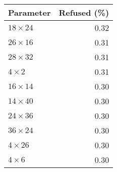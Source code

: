 \begin{tabular}{lr}
  \toprule
  Parameter & Refused (\%) \\
  \midrule
  $18 \times 24$ & 0.32 \\
  $26 \times 16$ & 0.31 \\
  $28 \times 32$ & 0.31 \\
  $4 \times 2$ & 0.31 \\
  $16 \times 14$ & 0.30 \\
  $14 \times 40$ & 0.30 \\
  $24 \times 36$ & 0.30 \\
  $36 \times 24$ & 0.30 \\
  $4 \times 26$ & 0.30 \\
  $4 \times 6$ & 0.30 \\
  \bottomrule
\end{tabular}

